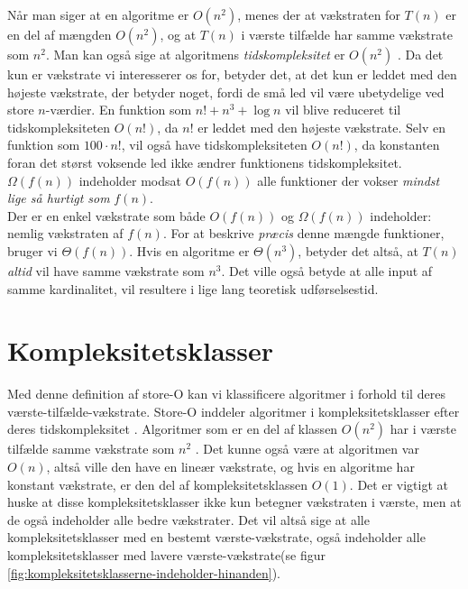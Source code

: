 Når man siger at en algoritme er $O(n^2)$, menes der at vækstraten for $T(n)$ er en del af mængden $O(n^2)$, og at $T(n)$ i værste tilfælde har samme vækstrate som $n^2$. Man kan også sige at algoritmens \emph{tidskompleksitet} er $O(n^2)$ \cite{time-complexity-use}. Da det kun er vækstrate vi interesserer os for, betyder det, at det kun er leddet med den højeste vækstrate, der betyder noget, fordi de små led vil være ubetydelige ved store $n$-værdier. En funktion som $n! + n^3+\log n$ vil blive reduceret til tidskompleksiteten $O(n!)$, da $n!$ er leddet med den højeste vækstrate. Selv en funktion som $100 \cdot n!$, vil også have tidskompleksiteten $O(n!)$, da konstanten foran det størst voksende led ikke ændrer funktionens tidskompleksitet.\\

$\Omega (f(n))$ indeholder modsat $O(f(n))$ alle funktioner der vokser \emph{mindst lige så hurtigt som} $f(n)$.\\ 

Der er en enkel vækstrate som både $O(f(n))$ og $\Omega (f(n))$ indeholder: nemlig vækstraten af $f(n)$. For at beskrive \emph{præcis} denne mængde funktioner, bruger vi $\Theta (f(n))$. Hvis en algoritme er $\Theta (n^3)$, betyder det altså, at $T(n)$ \emph{altid} vil have samme vækstrate som $n^3$. Det ville også betyde at alle input af samme kardinalitet, vil resultere i lige lang teoretisk udførselsestid.


\section{Kompleksitetsklasser} 
\label{sec:Kompleksitetsklasser}


Med denne definition af store-O kan vi klassificere algoritmer i forhold til deres værste-tilfælde-vækstrate. Store-O inddeler algoritmer i kompleksitetsklasser efter deres tidskompleksitet \cite{time-complexity}. Algoritmer som er en del af klassen $O(n^2)$ har i værste tilfælde samme vækstrate som $n^2$ . Det kunne også være at algoritmen var $O(n)$, altså ville den have en lineær vækstrate, og hvis en algoritme har konstant vækstrate, er den del af kompleksitetsklassen $O(1)$. Det er vigtigt at huske at disse kompleksitetsklasser ikke kun betegner vækstraten i værste, men at de også indeholder alle bedre vækstrater. Det vil altså sige at alle kompleksitetsklasser med en bestemt værste-vækstrate, også indeholder alle kompleksitetsklasser med lavere værste-vækstrate(se figur \ref{fig:kompleksitetsklasserne-indeholder-hinanden}).

